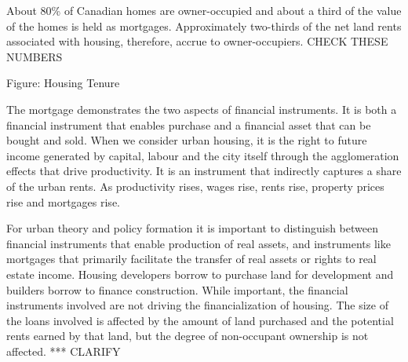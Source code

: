 About 80\% of Canadian homes are owner-occupied and about a third of the value of the homes is held as mortgages. Approximately two-thirds of the net land rents associated with housing, therefore, accrue to owner-occupiers. {\color {red}CHECK THESE NUMBERS } 


\begin{center}
\end{center}

Figure: Housing Tenure 

The mortgage demonstrates the two aspects of financial instruments. It is both a financial instrument that enables  purchase and a financial asset that can be bought and sold. When we consider urban housing, it is the right to future income generated by capital, labour and the city itself through the agglomeration effects that drive productivity. It is an instrument that indirectly captures a share of the urban rents. As productivity rises, wages rise, rents rise, property prices rise and mortgages rise. 

For urban theory and policy formation it is important to distinguish between financial instruments that enable production of real assets, and instruments like  mortgages that primarily facilitate the transfer of real assets or rights to real estate  income. Housing developers borrow to purchase land for development and builders borrow to finance construction. While important, the financial instruments involved are not driving the financialization of housing.  The size of the loans involved is affected by the amount of land purchased and the potential rents earned by that land, but the degree of non-occupant ownership is not affected. *** CLARIFY
  
